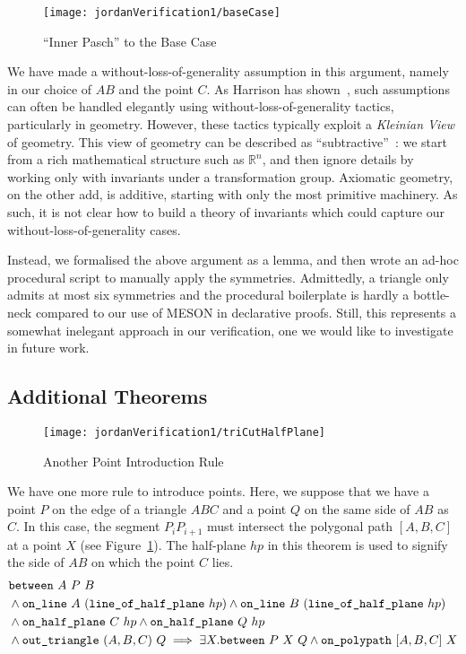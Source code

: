 \begin{figure}
\centering\texttt{[image: jordanVerification1/baseCase]}
\caption{``Inner Pasch'' to the Base Case}
\end{figure}

We have made a without-loss-of-generality assumption in this argument, namely in our choice of $AB$ and the point $C$. As Harrison has shown~\cite{HarrisonWLOG}, such assumptions can often be handled elegantly using without-loss-of-generality tactics, particularly in geometry. However, these tactics typically exploit a \emph{Kleinian View} of geometry. This view of geometry can be described as ``subtractive''~\cite{SubtractiveKlein}: we start from a rich mathematical structure such as $\mathbb{R}^n$, and then ignore details by working only with invariants under a transformation group. Axiomatic geometry, on the other add, is additive, starting with only the most primitive machinery. As such, it is not clear how to build a theory of invariants which could capture our without-loss-of-generality cases.

Instead, we formalised the above argument as a lemma, and then wrote an ad-hoc procedural script to manually apply the symmetries. Admittedly, a triangle only admits at most six symmetries and the procedural boilerplate is hardly a bottle-neck compared to our use of MESON in declarative proofs. Still, this represents a somewhat inelegant approach in our verification, one we would like to investigate in future work.

\subsection{Additional Theorems}\label{sec:AdditionalTheorems}
\begin{figure}
\centering
\texttt{[image: jordanVerification1/triCutHalfPlane]}
\caption{Another Point Introduction Rule}
\label{fig:triCutHalfPlane}
\end{figure}

We have one more rule to introduce points. Here, we suppose that we have a point $P$ on the edge of a triangle $ABC$ and a point $Q$ on the same side of $AB$ as $C$. In this case, the segment $P_iP_{i+1}$ must intersect the polygonal path $[A,B,C]$ at a point $X$ (see Figure~\ref{fig:triCutHalfPlane}). The half-plane $hp$ in this theorem is used to signify the side of $AB$ on which the point $C$ lies.
\begin{equation}\label{eq:triCutHalfPlane}
\begin{split}
&\between{A}{P}{B}\\
&\wedge \code{on\_line}\ A\ (\code{line\_of\_half\_plane}\ hp) \wedge \code{on\_line}\ B\ (\code{line\_of\_half\_plane}\ hp)\\
&\wedge \code{on\_half\_plane}\ C\ hp \wedge \code{on\_half\_plane}\ Q\ hp\\
&\wedge \code{out\_triangle}\ (A,B,C)\ Q\implies \exists X. \between{P}{X}{Q} \wedge \code{on\_polypath}\ [A,B,C]\ X
\end{split}
\end{equation}

